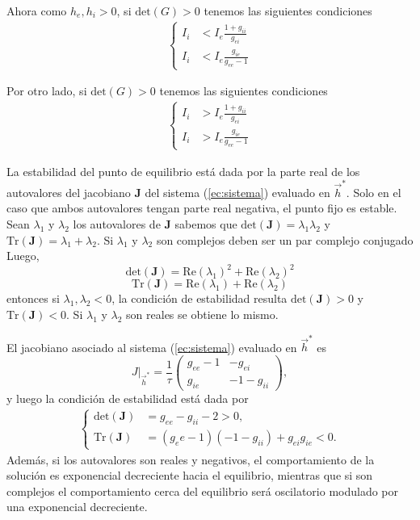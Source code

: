 \documentclass[11pt,twocolumn,twoside]{opticajnl}
\begin{document}
Ahora como $h_e,h_i > 0$, si $\text{det}(G) > 0$ tenemos las siguientes condiciones
\begin{align}
    \left\{
    \begin{aligned}
        I_i &< I_e \frac{1+g_{ii}}{g_{ei}}\\
        I_i &< I_e \frac{g_{ie}}{g_{ee}-1}
    \end{aligned}
    \right.
\end{align}

Por otro lado, si $\text{det}(G) > 0$ tenemos las siguientes condiciones
\begin{align}
    \left\{
    \begin{aligned}
        I_i &> I_e \frac{1+g_{ii}}{g_{ei}}\\
        I_i &> I_e \frac{g_{ie}}{g_{ee}-1}
    \end{aligned}
    \right.
\end{align}

La estabilidad del punto de equilibrio está dada por la parte real de los autovalores del jacobiano $\boldsymbol{J}$ del sistema (\ref{ec:sistema}) evaluado en $\vec{h}^*$. Solo en el caso que ambos autovalores tengan parte real negativa, el punto fijo es estable. Sean $\lambda_1$ y $\lambda_2$ los autovalores de $\boldsymbol{J}$ sabemos que $\text{det}(\boldsymbol{J}) = \lambda_1\lambda_2$ y $\text{Tr}(\boldsymbol{J}) = \lambda_1 + \lambda_2$. Si $\lambda_1$ y $\lambda_2$ son complejos deben ser un par complejo conjugado Luego, 
\begin{equation}
    \text{det}(\boldsymbol{J}) = \text{Re}(\lambda_1)^2 + \text{Re}(\lambda_2)^2 
\end{equation}
\begin{equation}
    \text{Tr}(\boldsymbol{J}) = \text{Re}(\lambda_1) + \text{Re}(\lambda_2) 
\end{equation}
entonces si $\lambda_1, \lambda_2 < 0$, la condición de estabilidad resulta $ \text{det}(\boldsymbol{J}) > 0$ y $\text{Tr}(\boldsymbol{J}) < 0$. Si $\lambda_1$ y $\lambda_2$ son reales se obtiene lo mismo. 

El jacobiano asociado al sistema (\ref{ec:sistema}) evaluado en $\vec{h}^*$ es 
\[
J|_{\vec{h}^*} = \frac{1}{\tau}\begin{pmatrix} g_{ee} - 1 & -g_{ei} \\ g_{ie} & -1-g_{ii} \end{pmatrix},
\]
y luego la condición de estabilidad está dada por
\begin{align}
    \left\{
    \begin{aligned}
        \text{det}(\boldsymbol{J}) & = g_{ee} - g_{ii} -2 > 0, \\
        \text{Tr}(\boldsymbol{J}) &= (g_ee-1)(-1-g_{ii}) +g_{ei}g_{ie} < 0.
    \end{aligned}
    \right.
\end{align}
Además, si los autovalores son reales y negativos, el comportamiento de la solución es exponencial decreciente hacia el equilibrio, mientras que si son complejos el comportamiento cerca del equilibrio será oscilatorio modulado por una exponencial decreciente.
\end{document}
